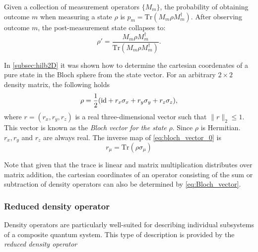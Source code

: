 \begin{definition}
  Given a collection of measurement operators \( \{M_m\} \), the probability of obtaining outcome \( m \) when measuring a state \( \rho \) is $p_m = \text{Tr}(M_m \rho M_m^\dagger).$
  After observing outcome $ m $, the post-measurement state collapses to:
  \[
  \rho' = \frac{M_m \rho M_m^\dagger}{\text{Tr}(M_m \rho M_m^\dagger)}.
  \]
\end{definition}


\begin{definition}
  In \autoref{subsec:hilb2D} it was shown how to determine the cartesian coordenates of a pure state in the Bloch sphere from the state vector. For an arbitrary $2 \times 2$ density matrix, the following holds
\begin{equation} \label{eq:bloch_vector_0}
  \rho = \frac{1}{2}(\mathrm{id} + r_{x}\sigma_{x} + r_{y}\sigma_{y} + r_{z}\sigma_{z}),
\end{equation}
where $r = (r_x, r_y, r_z)$ is a real three-dimensional vector such that $\| r \|_2 \leq 1$. This vector is known as the \emph{Bloch vector for the state} $\rho$. Since $\rho$ is Hermitian. $r_x, r_y$ and $r_z$ are always real.  The inverse map of \autoref{eq:bloch_vector_0} is
\begin{equation}
  \label{eq:Bloch_vector}
  r_{\mu} = \text{Tr}(\rho \sigma_{\mu})
  \end{equation} 
\end{definition}


  Note that given that the trace is linear and matrix multiplication distributes over matrix addition, the cartesian coordinates of an operator consisting of the sum or subtraction of density operators can also be determined by \autoref{eq:Bloch_vector}.

\subsubsection{Reduced density operator}

Density operators are particularly well-suited for describing individual subsystems of a composite quantum system. This type of description is provided by the \emph{reduced density operator}

